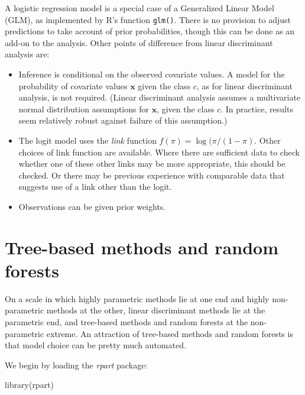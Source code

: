 \documentclass{tufte-book}\usepackage[]{graphicx}\usepackage[]{color}
\newcommand{\txtt}[1]{\texttt{#1}}
\begin{document}
A logistic regression model is a special case of a Generalized
Linear Model (GLM), as implemented by R's function \txtt{glm()}. 
There is no provision to adjust predictions to take account of
prior probabilities, though this can be done as an add-on to the analysis.
Other points of difference from linear discriminant analysis are:

\begin{itemize}
\item Inference is conditional on the observed covariate values. A model
  for the probability of covariate values $\mathbf{x}$ given the class
  $c$, as for linear discriminant analysis, is not required.
  (Linear discriminant analysis assumes a multivariate normal distribution
  assumptions for $\mathbf{x}$, given the class $c$. In practice, results
  seem relatively robust against failure of this assumption.)
\item The logit model uses the {\em link} function $f(\pi) =
  \log(\pi/(1-\pi)$. Other choices of link function are available.
  Where there are sufficient data to check whether one of these other
  links may be more appropriate, this should be checked.  Or there may
  be previous experience with comparable data that suggests use of a
  link other than the logit.
\item Observations can be given prior weights.
\end{itemize}

\section{Tree-based methods and random forests}
On a scale in which highly parametric methods lie at one end and
highly non-parametric methods at the other, linear discriminant
methods lie at the parametric end, and tree-based methods and random
forests at the non-parametric extreme.  An attraction of tree-based
methods and random forests is that model choice can be pretty much
automated.

We begin by loading the {\em rpart} package:
\begin{Schunk}
\begin{Sinput}
library(rpart)
\end{Sinput}
\end{Schunk}
\end{document}
